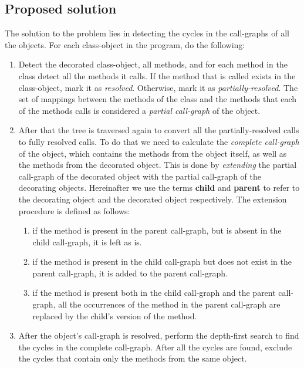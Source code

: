 \subsection{Proposed solution}
The solution to the problem lies in detecting the cycles in the call-graphs of all the objects. For each class-object in the program, do the following:
\begin{enumerate}
    \item Detect the decorated class-object, all methods, and for each method in the class detect all the methods it calls. If the method that is called exists in the class-object, mark it as \textit{resolved}. Otherwise, mark it as \textit{partially-resolved}. The set of mappings between the methods of the class and the methods that each of the methods calls is considered a \textit{partial call-graph} of the object.
    \item After that the tree is traversed again to convert all the partially-resolved calls to fully resolved calls. To do that we need to calculate the \textit{complete call-graph} of the object, which contains the methods from the object itself, as well as the methods from the decorated object. This is done by \textit{extending} the partial call-graph of the decorated object with the partial call-graph of the decorating objects. Hereinafter we use the terms \textbf{child} and \textbf{parent} to refer to the decorating object and the decorated object respectively. The extension procedure is defined as follows:
          \begin{enumerate}
              \item if the method is present in the parent call-graph, but is absent in the child call-graph, it is left as is.
              \item if the method is present in the child call-graph but does not exist in the parent call-graph, it is added to the parent call-graph.
              \item if the method is present both in the child call-graph and the parent call-graph, all the occurrences of the method in the parent call-graph are replaced by the child's version of the method.
          \end{enumerate}
    \item After the object's call-graph is resolved, perform the depth-first search \cite{dfs} to find the cycles in the complete call-graph. After all the cycles are found, exclude the cycles that contain only the methods from the same object.
\end{enumerate}


